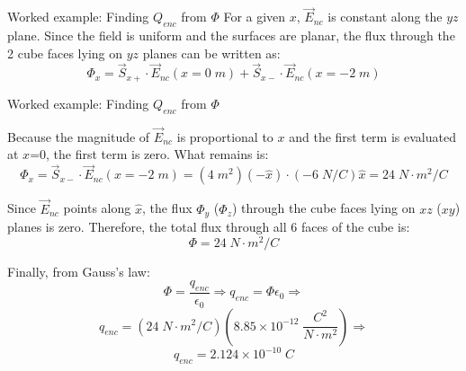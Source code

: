 {\begin{frame}{Worked example: Finding $Q_{enc}$ from $\Phi$}
  For a given $x$, $\vec{E}_{nc}$ is constant along the $yz$ plane.
  Since the field is uniform and the surfaces are planar,
  the flux through the 2 cube faces lying on $yz$ planes can be written as:
  \begin{equation*}
  	\Phi_{x} =
  	     \vec{S}_{x+} \cdot \vec{E}_{nc}(x = 0 \; m)
  		 + \vec{S}_{x-} \cdot \vec{E}_{nc}(x = -2 \; m)
  \end{equation*}

\end{frame}

%
%
%

\begin{frame}{Worked example: Finding $Q_{enc}$ from $\Phi$}

  Because the magnitude of $\vec{E}_{nc}$ is proportional
  to $x$ and the first term is evaluated at $x$=0, the first term is zero.
  What remains is:
  \begin{equation*}
  	\Phi_{x} = \vec{S}_{x-} \cdot \vec{E}_{nc}(x = -2 \; m)
      	     = (4 \; m^2) (-\hat{x}) \cdot (-6 \; N/C) \hat{x}
  					 = 24 \; N \cdot m^2/C
  \end{equation*}

  Since $\vec{E}_{nc}$ points along $\hat{x}$,
  the flux $\Phi_{y}$ ($\Phi_{z}$) through the cube faces lying on $xz$ ($xy$)
  planes is zero.
  Therefore, the total flux through all 6 faces of the cube is:
  \begin{equation*}
  	\Phi =  24 \; N \cdot m^2/C
  \end{equation*}

  Finally, from Gauss's law:
  \begin{equation*}
  	\Phi = \frac{q_{enc}}{\epsilon_0} \Rightarrow
  	q_{enc} = \Phi \epsilon_0 \Rightarrow
  \end{equation*}
  \begin{equation*}
  	q_{enc} = (24 \; N \cdot m^2/C) (8.85 \times 10^{-12}
     \; \frac{C^2}{N \cdot m^2}) \Rightarrow
  \end{equation*}
  \begin{equation*}
  	q_{enc} = 2.124  \times 10^{-10} \; C
  \end{equation*}

\end{frame}

} %


%
%
%

